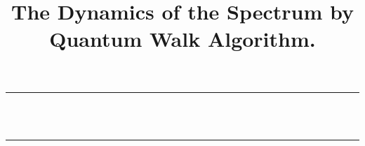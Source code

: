 
\newcommand\email[1]{
    \href{mailto:#1}{\url{#1}}
}

\newcommand\authorblock[3]{
    #1\\
    \small{#2}\\
    \small{\email{#3}}
}

\newcommand\keywords[1]{
    \vspace{5mm}\noindent
    \small{\textbf{\textit{Keywords ---}} #1}
}

\title{The Dynamics of the Spectrum by Quantum Walk Algorithm.}



\begin{titlepage}
    \newcommand{\HRule}{\rule{\linewidth}{0.5mm}}

	\center

	\HRule\\[0.4cm]

	{\huge\bfseries \thetitle\\[0.4cm]}

	\HRule\\[1.5cm]


\end{titlepage}
